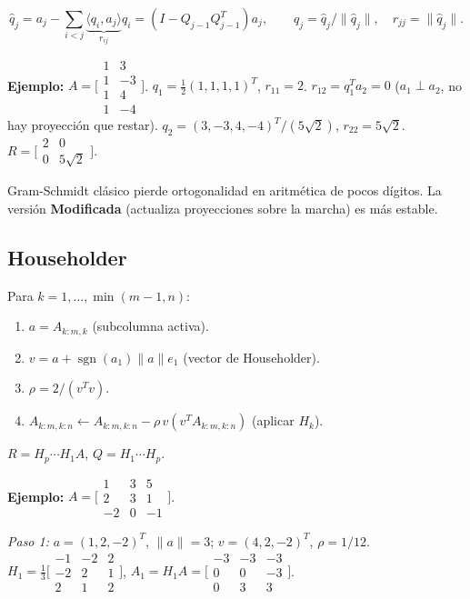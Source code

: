 \documentclass[12pt,a4paper]{article}
\begin{document}
\[
  \hat{q}_j = a_j - \sum_{i<j}\underbrace{\langle q_i,a_j\rangle}_{r_{ij}}q_i
  = (I-Q_{j-1}Q_{j-1}^T)a_j,\qquad q_j=\hat{q}_j/\|\hat{q}_j\|,\quad r_{jj}=\|\hat{q}_j\|.
\]

\textbf{Ejemplo:} $A=\bigl[\begin{smallmatrix}1&3\\1&-3\\1&4\\1&-4\end{smallmatrix}\bigr]$.
$q_1=\tfrac{1}{2}(1,1,1,1)^T$, $r_{11}=2$.
$r_{12}=q_1^Ta_2=0$ ($a_1\perp a_2$, no hay proyección que restar).
$q_2=(3,-3,4,-4)^T/(5\sqrt{2})$, $r_{22}=5\sqrt{2}$.
$R=\bigl[\begin{smallmatrix}2&0\\0&5\sqrt{2}\end{smallmatrix}\bigr]$.

\begin{alerta}
Gram-Schmidt clásico pierde ortogonalidad en aritmética de pocos dígitos. La versión \textbf{Modificada} (actualiza proyecciones sobre la marcha) es más estable.
\end{alerta}

\subsection{Householder}

\begin{algoritmo}[title={QR por Householder}]
Para $k=1,\ldots,\min(m-1,n)$:
\begin{enumerate}[noitemsep]
  \item $a=A_{k:m,k}$ (subcolumna activa).
  \item $v=a+\operatorname{sgn}(a_1)\|a\|e_1$ (vector de Householder).
  \item $\rho=2/(v^Tv)$.
  \item $A_{k:m,k:n}\leftarrow A_{k:m,k:n}-\rho\,v(v^TA_{k:m,k:n})$ (aplicar $H_k$).
\end{enumerate}
$R=H_p\cdots H_1A$, $Q=H_1\cdots H_p$.
\end{algoritmo}

\textbf{Ejemplo:} $A=\bigl[\begin{smallmatrix}1&3&5\\2&3&1\\-2&0&-1\end{smallmatrix}\bigr]$.

\textit{Paso 1:} $a=(1,2,-2)^T$, $\|a\|=3$; $v=(4,2,-2)^T$, $\rho=1/12$.
$H_1=\tfrac{1}{3}\bigl[\begin{smallmatrix}-1&-2&2\\-2&2&1\\2&1&2\end{smallmatrix}\bigr]$,
$A_1=H_1A=\bigl[\begin{smallmatrix}-3&-3&-3\\0&0&-3\\0&3&3\end{smallmatrix}\bigr]$.
\end{document}
